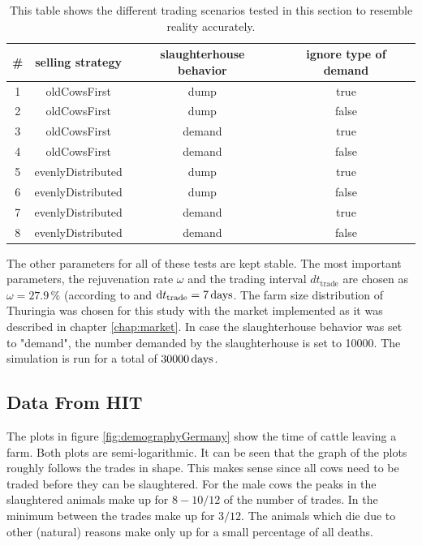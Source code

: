 \begin{table}[htb]
    \begin{center}
    \begin{tabular}{|cccc|}\hline
        \rowcolor{dunkelgrau} \#  & selling strategy & slaughterhouse behavior & ignore type of demand \\\hline
                              1  & oldCowsFirst& dump& true\\\hline
\rowcolor{hellgrau}           2  & oldCowsFirst& dump&  false\\\hline
                              3  & oldCowsFirst& demand& true\\\hline
\rowcolor{hellgrau}           4  & oldCowsFirst& demand& false\\\hline
                              5  & evenlyDistributed&dump& true\\\hline
\rowcolor{hellgrau}           6  & evenlyDistributed& dump& false\\\hline 
                              7 & evenlyDistributed& demand& true\\ \hline
\rowcolor{hellgrau}           8 & evenlyDistributed & demand&  false \\\hline           
\end{tabular}
\caption[Tested Trading Configurations]{This table shows the different trading scenarios tested in this section to resemble reality accurately.}
\label{tab:tradingConfig} 
\end{center}
\end{table}
The other parameters for all of these tests are kept stable. The most important parameters, the rejuvenation rate $\omega$ and the trading interval $dt_\text{trade}$ are chosen as $\omega =27.9\,\%$ (according to \citep{personalCom} and $\text{d}t_\text{trade} = 7\,\text{days}$. The farm size distribution of Thuringia was chosen for this study with the market implemented as it was described in chapter \ref{chap:market}. In case the slaughterhouse behavior was set to "demand", the number demanded by the slaughterhouse is set to 10000. The simulation is run for a total of $30000\,\text{days}$.

\subsection{Data From HIT}
The plots in figure \ref{fig:demographyGermany} show the time of cattle leaving a farm. Both plots are semi-logarithmic. It can be seen that the graph of the plots roughly follows the trades in shape. This makes sense since all cows need to be traded before they can be slaughtered. For the male cows the peaks in the slaughtered animals make up for $8-10/12$ of the number of trades. In the minimum between the trades make up for $3/12$. The animals which die due to other (natural) reasons make only up for a small percentage of all deaths.



